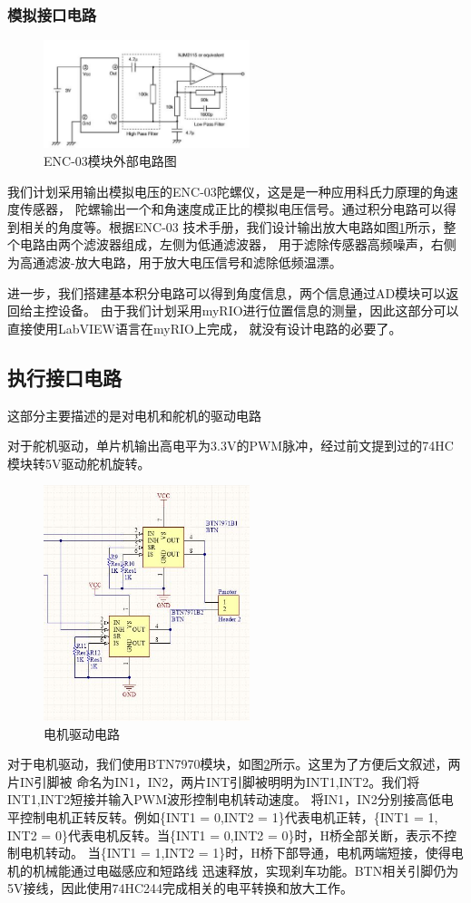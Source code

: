 \documentclass[a4paper]{paper}
\begin{document}
\subsubsection{模拟接口电路}
\begin{figure}
    \centering
    \includegraphics[width = 60mm]{enc.jpg}
    \caption{ENC-03模块外部电路图}
    \label{ENC}
\end{figure}
我们计划采用输出模拟电压的ENC-03陀螺仪，这是是一种应用科氏力原理的角速度传感器，
陀螺输出一个和角速度成正比的模拟电压信号。通过积分电路可以得到相关的角度等。根据ENC-03
技术手册，我们设计输出放大电路如图\ref{ENC}所示，整个电路由两个滤波器组成，左侧为低通滤波器，
用于滤除传感器高频噪声，右侧为高通滤波-放大电路，用于放大电压信号和滤除低频温漂。

进一步，我们搭建基本积分电路可以得到角度信息，两个信息通过AD模块可以返回给主控设备。
由于我们计划采用myRIO进行位置信息的测量，因此这部分可以直接使用LabVIEW语言在myRIO上完成，
就没有设计电路的必要了。

\subsection{执行接口电路}
这部分主要描述的是对电机和舵机的驱动电路

对于舵机驱动，单片机输出高电平为3.3V的PWM脉冲，经过前文提到过的74HC模块转5V驱动舵机旋转。

\begin{figure}
    \centering
    \includegraphics[width =60mm]{motor1.jpg}
    \caption{电机驱动电路}
    \label{motor1}
\end{figure}
对于电机驱动，我们使用BTN7970模块，如图\ref{motor1}所示。这里为了方便后文叙述，两片IN引脚被
命名为IN1，IN2，两片INT引脚被明明为INT1,INT2。我们将INT1,INT2短接并输入PWM波形控制电机转动速度。
将IN1，IN2分别接高低电平控制电机正转反转。例如\{INT1 = 0,INT2 = 1\}代表电机正转，\{INT1 = 1,
INT2 = 0\}代表电机反转。当\{INT1 = 0,INT2 = 0\}时，H桥全部关断，表示不控制电机转动。
当\{INT1 = 1,INT2 = 1\}时，H桥下部导通，电机两端短接，使得电机的机械能通过电磁感应和短路线
迅速释放，实现刹车功能。BTN相关引脚仍为5V接线，因此使用74HC244完成相关的电平转换和放大工作。
\end{document}
